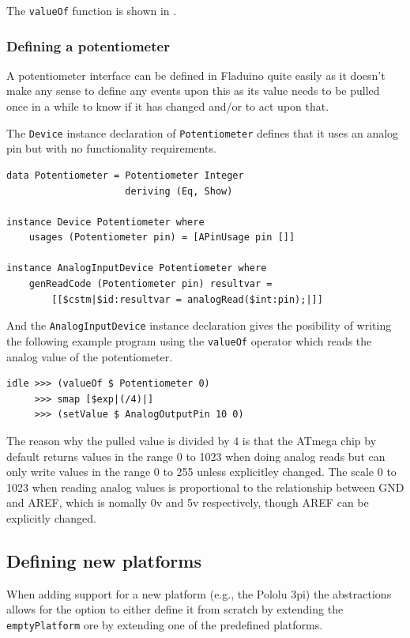\documentclass[a4paper, oneside, final]{memoir}
\let\Fref\undefined
\begin{document}
The \texttt{valueOf} function is shown in \Fref{sec:valueOf}.


\subsubsection{Defining a potentiometer}
\label{sec:potentiometer device}

A potentiometer interface can be defined in Fladuino quite easily as it doesn't
make any sense to define any events upon this as its value needs to be pulled
once in a while to know if it has changed and/or to act upon that.

The \texttt{Device} instance declaration of \texttt{Potentiometer} defines that
it uses an analog pin but with no functionality requirements.

\begin{verbatim}
data Potentiometer = Potentiometer Integer
                     deriving (Eq, Show)

instance Device Potentiometer where
    usages (Potentiometer pin) = [APinUsage pin []]

instance AnalogInputDevice Potentiometer where
    genReadCode (Potentiometer pin) resultvar = 
        [[$cstm|$id:resultvar = analogRead($int:pin);|]]
\end{verbatim}

And the \texttt{AnalogInputDevice} instance declaration gives the posibility of
writing the following example program using the \texttt{valueOf} operator which
reads the analog value of the potentiometer.

\begin{verbatim}
idle >>> (valueOf $ Potentiometer 0) 
     >>> smap [$exp|(/4)|] 
     >>> (setValue $ AnalogOutputPin 10 0)
\end{verbatim}

The reason why the pulled value is divided by 4 is that the ATmega
chip by default returns values in the range 0 to 1023 when doing
analog reads but can only write values in the range 0 to 255 unless
explicitley changed. The scale 0 to 1023 when reading analog values is
proportional to the relationship between GND and AREF, which is
nomally 0v and 5v respectively, though AREF can be explicitly changed.

\subsection{Defining new platforms}

When adding support for a new platform (e.g., the Pololu 3pi) the abstractions
allows for the option to either define it from scratch by extending the
\texttt{emptyPlatform} ore by extending one of the predefined platforms.
\end{document}
